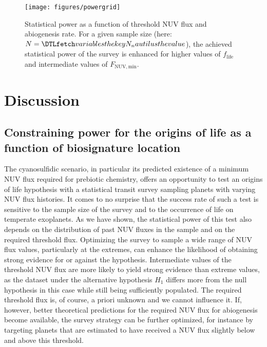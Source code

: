 \documentclass[twocolumn,twocolappendix,linenumbers]{aastex631}
\begin{document}
\begin{figure*}
    \begin{centering}
        \texttt{[image: figures/powergrid]}
        \caption{Statistical power as a function of threshold \gls{NUV} flux and abiogenesis rate. For a given sample size (here: $N=\var{N_nautilus}$), the achieved statistical power of the survey is enhanced for higher values of $f_\mathrm{life}$ and intermediate values of $F_\mathrm{NUV, min}$.}
        \label{fig:powergrid}
    \end{centering}
\end{figure*}



\section{Discussion}
\label{sec:discussion}
\subsection{Constraining power for the origins of life as a function of biosignature location}
The cyanosulfidic scenario, in particular its predicted existence of a minimum \gls{NUV} flux required for prebiotic chemistry, offers an opportunity to test an origins of life hypothesis with a statistical transit survey sampling planets with varying \gls{NUV} flux histories.
It comes to no surprise that the success rate of such a test is sensitive to the sample size of the survey and to the occurrence of life on temperate exoplanets.
As we have shown, the statistical power of this test also depends on the distribution of past \gls{NUV} fluxes in the sample and on the required threshold flux.
Optimizing the survey to sample a wide range of NUV flux values, particularly at the extremes, can enhance the likelihood of obtaining strong evidence for or against the hypothesis.
Intermediate values of the threshold \gls{NUV} flux are more likely to yield strong evidence than extreme values, as the dataset under the alternative hypothesis $H_1$ differs more from the null hypothesis in this case while still being sufficiently populated.
The required threshold flux is, of course, a priori unknown and we cannot influence it.
If, however, better theoretical predictions for the required \gls{NUV} flux for abiogenesis become available, the survey strategy can be further optimized, for instance by targeting planets that are estimated to have received a \gls{NUV} flux slightly below and above this threshold.
\end{document}
